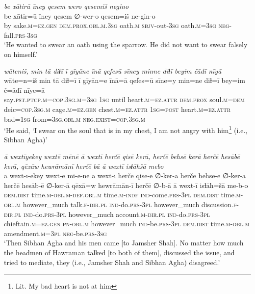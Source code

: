 \ea \label{DP.37}
\textit{be xātirū īney qesem wero qesemiš negino} \\ 
\gll be xātir=ū īney qesem ∅-wer-o qesem=iš ne-gin-o \\ 
 by sake\textsc{.m}\textsc{=ez}\textsc{.gen} \textsc{dem.prox}\textsc{.obl}\textsc{.m}\textsc{.3sg} oath\textsc{.m} \textsc{sbjv-}out\textsc{-3sg} oath\textsc{.m}\textsc{=3sg} \textsc{neg-}fall\textsc{.prs}\textsc{-3sg} \\ 
\glt `He wanted to swear an oath using the sparrow. He did not want to swear falsely on himself.'
\z 
 
\ea \label{DP.38}
\textit{wāteniš, min tā diɫī ī gīyāne īnā qefesū sīney minne diɫī beyim čāđī nīyā} \\ 
\gll wāte=n=iš min tā diɫ=ī ī gīyān=e īnā=ā qefes=ū sīne=y min=ne diɫ=ī bey=im č=āđī nīye=ā \\ 
 say\textsc{.pst}\textsc{.ptcp}\textsc{.m}\textsc{=cop}\textsc{.3sg}\textsc{.m}\textsc{=3sg} \textsc{1sg} until heart\textsc{.m}\textsc{=ez}.\textsc{attr} \textsc{dem.prox} soul\textsc{.m}\textsc{=dem} deic\textsc{=cop}\textsc{.3sg}\textsc{.m} cage\textsc{.m}\textsc{=ez}\textsc{.gen} chest\textsc{.m}\textsc{=ez}.\textsc{attr} \textsc{1sg}\textsc{=\textsc{post}} heart\textsc{.m}\textsc{=ez}.\textsc{attr} bad\textsc{=1sg} from\textsc{=3sg}\textsc{.obl}\textsc{.m} \textsc{\textsc{neg.}exist}\textsc{=cop}\textsc{.3sg}\textsc{.m} \\ 
\glt `He said, ‘I swear on the soul that is in my chest, I am not angry with him\footnote{Lit. My bad heart is not at him} (i.e., Sibhan Agha)'
\z 
 
\ea \label{DP.46}
\textit{ā wextīyekey wextē mēnē ā wextī herčē qisē kerā, herčē behsē kerā herčē hesābē kerā, qēxāw hewrāmānī herčē bā ā wextī isɫāhšā mebo} \\ 
\gll ā wext-ī-ekey wext-ē mi-ē-nē ā wext-ī herčē qisē-ē ∅-ker-ā herčē behse-ē ∅-ker-ā herčē hesāb-ē ∅-ker-ā qēxā=w hewrāmān-ī herčē ∅-b-ā ā wext-ī isɫāh=šā me-b-o \\ 
 \textsc{dem.dist} time\textsc{.m}\textsc{-obl}\textsc{.m}\textsc{-def}\textsc{.obl}\textsc{.m} time\textsc{.m}\textsc{-indf} \textsc{ind-}come\textsc{.prs}\textsc{-3pl} \textsc{dem.dist} time\textsc{.m}\textsc{-obl}\textsc{.m} however\_much talk\textsc{\textsc{.f}}\textsc{-dir}\textsc{.pl} \textsc{ind-}do\textsc{.prs}\textsc{-3pl} however\_much discussion\textsc{\textsc{.f}}\textsc{-dir}\textsc{.pl} \textsc{ind-}do\textsc{.prs}\textsc{-3pl} however\_much account\textsc{.m}\textsc{-dir}\textsc{.pl} \textsc{ind-}do\textsc{.prs}\textsc{-3pl} chieftain\textsc{.m}\textsc{=ez}\textsc{.gen} \textsc{pn}\textsc{-obl}\textsc{.m} however\_much \textsc{ind-}be\textsc{.prs}\textsc{-3pl} \textsc{dem.dist} time\textsc{.m}\textsc{-obl}\textsc{.m} amendment\textsc{.m}\textsc{=3pl} \textsc{neg-}be\textsc{.prs}\textsc{-3sg} \\ 
\glt `Then Sibhan Agha and his men came [to Jamsher Shah]. No matter how much the headmen of Hawraman talked [to both of them], discussed the issue, and tried to mediate, they (i.e., Jamsher Shah and Sibhan Agha) disagreed.'
\z 
 
